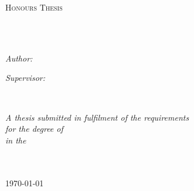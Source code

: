 \documentclass[
12pt, %
oneside, %
english, %
onehalfspacing, %
headsepline, %
]{MastersDoctoralThesis} %
\author{Lachlan \textsc{McDonald}} %
\begin{document}
\frontmatter %

\pagestyle{plain} %


\begin{titlepage}
\begin{center}

\vspace*{.06\textheight}
{\scshape\LARGE \univname\par}\vspace{1.5cm} %
\textsc{\Large Honours Thesis}\\[0.5cm] %

\HRule \\[0.4cm] %
{\huge \bfseries \ttitle\par}\vspace{0.4cm} %
\HRule \\[1.5cm] %
 
\begin{minipage}[t]{0.4\textwidth}
\begin{flushleft} \large
\emph{Author: }\\
\authorname
\end{flushleft}
\end{minipage}
\begin{minipage}[t]{0.4\textwidth}
\begin{flushright} \large
\emph{Supervisor:} \\
\supname
\end{flushright}
\end{minipage}\\[3cm]
 
\vfill

\large \textit{A thesis submitted in fulfilment of the requirements\\ for the degree of \degreename}\\[0.3cm] %
\textit{in the}\\[0.4cm]
\groupname\\\deptname\\[2cm] %
 
\vfill

{\large \today}\\[4cm] %
 
\vfill
\end{center}
\end{titlepage}
\end{document}
